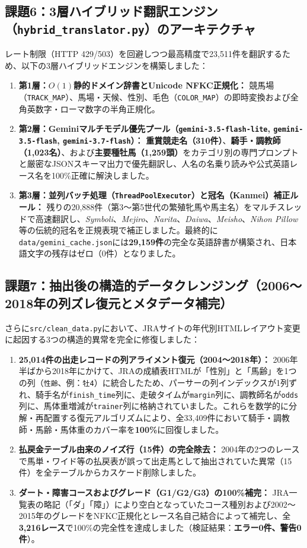 \documentclass[12pt,a4paper]{article}
\begin{document}
\subsection{課題6：3層ハイブリッド翻訳エンジン（\texttt{hybrid\_translator.py}）のアーキテクチャ}
レート制限（HTTP 429/503）を回避しつつ最高精度で23,511件を翻訳するため、以下の3層ハイブリッドエンジンを構築しました：
\begin{enumerate}
    \item \textbf{第1層：$O(1)$静的ドメイン辞書とUnicode NFKC正規化：} 競馬場（\texttt{TRACK\_MAP}）、馬場・天候、性別、毛色（\texttt{COLOR\_MAP}）の即時変換および全角英数字・ローマ数字の半角正規化。
    \item \textbf{第2層：Geminiマルチモデル優先プール（\texttt{gemini-3.5-flash-lite}, \texttt{gemini-3.5-flash}, \texttt{gemini-3.7-flash}）：} \textbf{重賞競走名（310件）}、\textbf{騎手・調教師（1,023名）}、および\textbf{主要種牡馬（1,259頭）}をカテゴリ別の専門プロンプトと厳密なJSONスキーマ出力で優先翻訳し、人名の名乗り読みや公式英語レース名を100\%正確に解決しました。
    \item \textbf{第3層：並列バッチ処理（\texttt{ThreadPoolExecutor}）と冠名（Kanmei）補正ルール：} 残りの20,888件（第3〜第5世代の繁殖牝馬や馬主名）をマルチスレッドで高速翻訳し、\textit{Symboli}、\textit{Mejiro}、\textit{Narita}、\textit{Daiwa}、\textit{Meisho}、\textit{Nihon Pillow}等の伝統的冠名を正規表現で補正しました。最終的に\texttt{data/gemini\_cache.json}には\textbf{29,159件}の完全な英語辞書が構築され、日本語文字の残存はゼロ（0件）となりました。
\end{enumerate}

\subsection{課題7：抽出後の構造的データクレンジング（2006〜2018年の列ズレ復元とメタデータ補完）}
さらに\texttt{src/clean\_data.py}において、JRAサイトの年代別HTMLレイアウト変更に起因する3つの構造的異常を完全に修復しました：
\begin{enumerate}
    \item \textbf{25,014件の出走レコードの列アライメント復元（2004〜2018年）：} 2006年半ばから2018年にかけて、JRAの成績表HTMLが「性別」と「馬齢」を1つの列（\texttt{性齢}、例：\texttt{牡4}）に統合したため、パーサーの列インデックスが1列ずれ、騎手名が\texttt{finish\_time}列に、走破タイムが\texttt{margin}列に、調教師名が\texttt{odds}列に、馬体重増減が\texttt{trainer}列に格納されていました。これらを数学的に分解・再配置する復元アルゴリズムにより、全33,409件において騎手・調教師・馬齢・馬体重のカバー率を\textbf{100\%}に回復しました。
    \item \textbf{払戻金テーブル由来のノイズ行（15件）の完全除去：} 2004年の2つのレースで馬単・ワイド等の払戻表が誤って出走馬として抽出されていた異常（15件）を全テーブルからカスケード削除しました。
    \item \textbf{ダート・障害コースおよびグレード（G1/G2/G3）の100\%補完：} JRA一覧表の略記（「ダ」「障」）により空白となっていたコース種別および2002〜2015年のグレードをNFKC正規化とレース名自己結合によって補完し、全\textbf{3,216レース}で100\%の完全性を達成しました（検証結果：\textbf{エラー0件、警告0件}）。
\end{enumerate}
\end{document}
